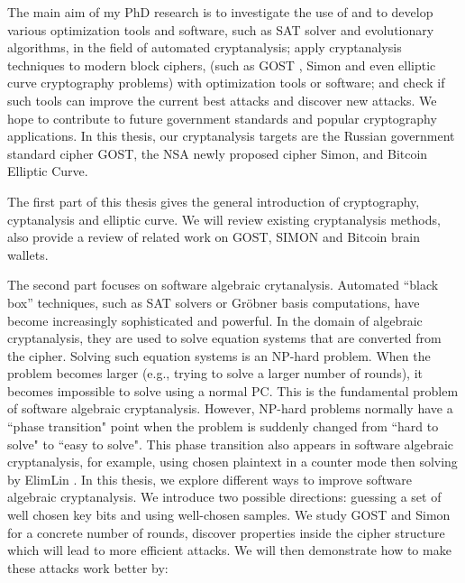 The main aim of my PhD research is to investigate the use of and to develop various optimization tools and software, such as SAT solver and evolutionary algorithms, in the field of automated cryptanalysis; apply cryptanalysis techniques to modern block ciphers, (such as GOST \cite{gost198928147}, Simon \cite{NSAciphers} and even elliptic curve cryptography problems) with optimization tools or software; and check if such tools can improve the current best attacks and discover new attacks. We hope to contribute to future government standards and popular cryptography applications. In this thesis, our cryptanalysis targets are the Russian government standard cipher GOST, the NSA newly proposed cipher Simon, and Bitcoin Elliptic Curve.

The first part of this thesis gives the general introduction of cryptography, cyptanalysis and elliptic curve. We will review existing cryptanalysis methods, also provide a review of related work on GOST, SIMON and Bitcoin brain wallets. 

The second part focuses on software algebraic crytanalysis. Automated “black box” techniques, such as SAT solvers or Gr\"{o}bner basis computations, have become increasingly sophisticated and powerful. In the domain of algebraic cryptanalysis, they are used to solve equation systems that are converted from the cipher. Solving such equation systems is an NP-hard problem. When the problem becomes larger (e.g., trying to solve a larger number of rounds), it becomes impossible to solve using a normal PC. This is the fundamental problem of software algebraic cryptanalysis. However, NP-hard problems normally have a ``phase transition" point when the problem is suddenly changed from ``hard to solve" to ``easy to solve". This phase transition also appears in software algebraic cryptanalysis, for example, using chosen plaintext in a counter mode then solving by ElimLin \cite{ElimLinR}. In this thesis, we explore different ways to improve software algebraic cryptanalysis. We introduce two possible directions: guessing a set of well chosen key bits and using well-chosen samples. We study GOST and Simon for a concrete number of rounds, discover properties inside the cipher structure which will lead to more efficient attacks. We will then demonstrate how to make these attacks work better by: %

